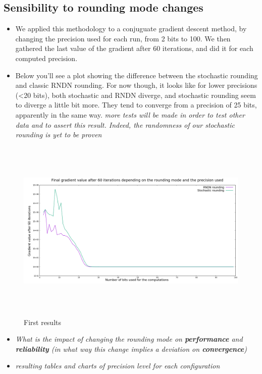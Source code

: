 \documentclass[a4paper,11pt]{article}
\begin{document}
\subsection{Sensibility to rounding mode changes}
\begin{itemize}
  \item We applied this methodology to a conjuguate gradient descent method, by changing the precision used for each run, from 2 bits to 100. We then gathered the last value of the gradient after 60 iterations, and did it for each computed precision. 
  \item Below you'll see a plot showing the difference between the stochastic rounding and classic RNDN rounding. For now though, it looks like for lower precisions (<20 bits), both stochastic and RNDN diverge, and stochastic rounding seem to diverge a little bit more. They tend to converge from a precision of 25 bits, apparently in the same way. \emph{more tests will be made in order to test other data and to assert this result. Indeed, the randomness of our stochastic rounding is yet to be proven} %
\end{itemize}
  \begin{figure}[h]
    \begin{center}
      \includegraphics[width=1.1\textwidth,height=250pt]{illustrations/simple_comparison.png}
      \caption{First results}
      \label{fig:}
    \end{center}
  \end{figure}
  \begin{itemize}
  \item \emph{What is the impact of changing the rounding mode on \textbf{performance} and \textbf{reliability} (in what way this change implies a deviation on \textbf{convergence}) }
  \item \emph{resulting tables and charts of precision level for each configuration}
\end{itemize}
\end{document}

